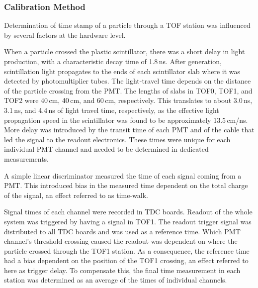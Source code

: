 \subsubsection{Calibration Method}

Determination of time stamp of a particle through a TOF station was
influenced by several factors at the hardware level.

When a particle crossed the plastic scintillator, there was a short delay in light
production, with a characteristic decay time of 1.8\,ns.
After generation, scintillation light propagates to the ends of each
scintillator slab where it was detected by photomultiplier tubes. The
light-travel time depends on the distance of the particle crossing
from the PMT. The lengths of slabs in TOF0, TOF1, and TOF2 were 40\,cm,
40\,cm, and 60\,cm, respectively. This translates to about 3.0\,ns, 3.1\,ns,
and 4.4\,ns of light travel time, respectively, as the effective light
propagation speed in the scintillator was found to be approximately
13.5\,cm/ns.  More delay was introduced by the transit time of each PMT
and of the cable that led the signal to the readout electronics. These
times were unique for each individual PMT channel and needed to be
determined in dedicated measurements.

A simple linear discriminator measured the time of each signal coming from a PMT.
This introduced bias in the measured time dependent on the total charge of the signal, an effect referred to as time-walk.

Signal times of each channel were recorded in TDC boards. Readout of
the whole system was triggered by having a signal in TOF1. The
readout trigger signal was distributed to all TDC boards and was used as
a reference time. Which PMT channel's threshold crossing caused the
readout was dependent on where the particle crossed through the TOF1
station. As a consequence, the reference time had a bias dependent on
the position of the TOF1 crossing, an effect referred to here as trigger
delay. To compensate this, the final time measurement in each station was determined as an average of the times of individual channels.

